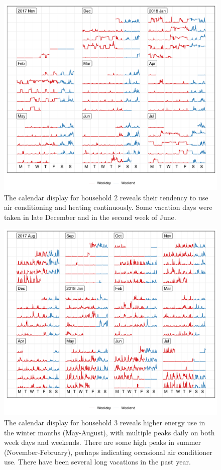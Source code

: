 \documentclass[12pt]{article}
\begin{document}
\begin{figure}

{\centering \includegraphics[width=\textwidth]{figure/h2-1} 

}

\caption{The calendar display for household 2 reveals their tendency to use air conditioning and heating continuously. Some vacation days were taken in late December and in the second week of June.}\label{fig:h2}
\end{figure}

\begin{figure}

{\centering \includegraphics[width=\textwidth]{figure/h3-1} 

}

\caption{The calendar display for household 3 reveals higher energy use in the winter months (May-August), with multiple peaks daily on both week days and weekends. There are some high peaks in summer (November-February), perhaps indicating occasional air conditioner use. There have been several long vacations in the past year.}\label{fig:h3}
\end{figure}
\end{document}
